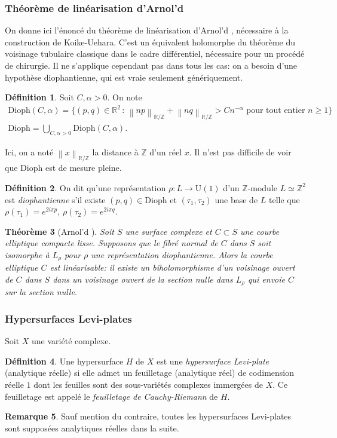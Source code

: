 \documentclass[JEP,XML,SOM,Unicode,francais,published]{cedram}
\newcommand{\Z}{\mathbb{Z}}
\newcommand{\R}{\mathbb{R}}
\newcommand{\rU}{\mathrm{U}}
\newcommand{\norm}[1]{\left\lVert#1\right\rVert}
\newtheorem{thm}{Théorème}
\theoremstyle{definition}
\newtheorem{rem}[thm]{Remarque}
\newtheorem{defn}[thm]{Définition}
\begin{document}
\subsubsection*{Théorème de linéarisation d'Arnol'd} On donne ici l'énoncé du théorème de linéarisation d'Arnol'd \cite{arnol1976bifurcations}, nécessaire à la construction de Koike-Uehara. C'est un équivalent holomorphe du théorème du voisinage tubulaire classique dans le cadre différentiel, nécessaire pour un procédé de chirurgie. Il ne s'applique cependant pas dans tous les cas: on a besoin d'une hypothèse diophantienne, qui est vraie seulement génériquement.
\begin{defn}
Soit $C, \alpha > 0$. On note
\begin{gather*}
\mathrm{Dioph}(C, \alpha) = \bigl\{(p, q) \in \R^2\,:\,\norm{np}_{\R/\Z} + \norm{nq}_{\R/\Z} > Cn^{-\alpha} \text{ pour tout entier } n \geq 1\bigr\}\\
\tag*{et}
\mathrm{Dioph} = \bigcup_{C, \alpha > 0} \mathrm{Dioph}(C, \alpha).
\end{gather*}
\end{defn}
Ici, on a noté $\norm{x}_{\R/\Z}$ la distance à $\Z$ d'un réel $x$. Il n'est pas difficile de voir que $\mathrm{Dioph}$ est de mesure pleine.
\begin{defn}
On dit qu'une représentation $\rho\colon L\to \rU(1)$ d'un $\Z$-module $L \simeq \Z^2$ est \emph{diophantienne} s'il existe $(p, q) \in \mathrm{Dioph}$ et $(\tau_1, \tau_2)$ une base de $L$ telle que $\rho(\tau_1) = e^{2i\pi p}$, $\rho(\tau_2) = e^{2i\pi q}$.
\end{defn}

\begin{thm}[Arnol'd \cite{arnol1976bifurcations}]
Soit $S$ une surface complexe et $C \subset S$ une courbe elliptique compacte lisse. Supposons que le fibré normal de $C$ dans $S$ soit isomorphe à $L_\rho$ pour $\rho$ une représentation diophantienne. Alors la courbe elliptique $C$ est \emph{linéarisable}: il existe un biholomorphisme d'un voisinage ouvert de $C$ dans $S$ dans un voisinage ouvert de la section nulle dans $L_\rho$ qui envoie $C$ sur la section nulle.
\end{thm}

\subsubsection*{Hypersurfaces Levi-plates}
Soit $X$ une variété complexe.
\begin{defn}
Une hypersurface $H$ de $X$ est une \emph{hypersurface Levi-plate} (analytique réelle) si elle admet un feuilletage (analytique réel) de codimension réelle $1$ dont les feuilles sont des sous-variétés complexes immergées de $X$. Ce feuilletage est appelé le \emph{feuilletage de Cauchy-Riemann} de $H$.
\end{defn}
\begin{rem}
Sauf mention du contraire, toutes les hypersurfaces Levi-plates sont supposées analytiques réelles dans la suite.
\end{rem}
\end{document}
